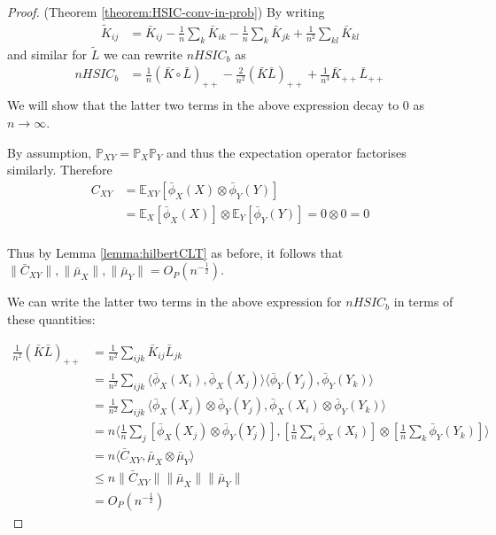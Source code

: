 \documentclass[]{article}
\begin{document}
\begin{proof}(Theorem \ref{theorem:HSIC-conv-in-prob})
By writing
\begin{align*}
\tilde{K}_{ij} &= \bar{K}_{ij} - \frac{1}{n}\sum_k\bar{K}_{ik} - \frac{1}{n}\sum_k\bar{K}_{jk} + \frac{1}{n^2}\sum_{kl}\bar{K}_{kl}
\end{align*} 
and similar for $\tilde{L}$ we can rewrite $nHSIC_b$ as 
\begin{align*}
nHSIC_b & = \frac{1}{n} (\bar{K}\circ \bar{L})_{++}  - \frac{2}{n^2}(\bar{K}\bar{L})_{++} + \frac{1}{n^3}\bar{K}_{++}\bar{L}_{++} \\
\end{align*}
We will show that the latter two terms in the above expression decay to 0 as $n\longrightarrow\infty$. 

By assumption, $\mathbb{P}_{XY} = \mathbb{P}_X\mathbb{P}_Y$ and thus the expectation operator factorises similarly. Therefore 
\begin{align*}
C_{XY} & = \mathbb{E}_{XY}[\bar{\phi}_X(X)\otimes\bar{\phi}_Y(Y)] \\
& = \mathbb{E}_{X}[\bar{\phi}_X(X)]\otimes\mathbb{E}_Y[\bar{\phi}_Y(Y)] = 0\otimes 0 = 0\\
\end{align*}

Thus by Lemma \ref{lemma:hilbertCLT} as before, it follows that $\|\bar{C}_{XY}\|, \|\bar{\mu}_X\|, \|\bar{\mu}_Y\| = O_P(n^{-\frac{1}{2}})$. 

We can write the latter two terms in the above expression for $nHSIC_b$ in terms of these quantities:

\begin{align*}
\frac{1}{n^2}(\bar{K}\bar{L})_{++} &= \frac{1}{n^2} \sum_{ijk}\bar{K}_{ij}\bar{L}_{jk}\\
&= \frac{1}{n^2} \sum_{ijk}\langle \bar{\phi}_X(X_i),\bar{\phi}_X(X_j) \rangle \langle \bar{\phi}_Y(Y_j),\bar{\phi}_Y(Y_k)\rangle \\&=
\frac{1}{n^2} \sum_{ijk}\langle \bar{\phi}_X(X_j)\otimes\bar{\phi}_Y(Y_j),
\bar{\phi}_X(X_i)\otimes\bar{\phi}_Y(Y_k)\rangle \\&=
n\langle \frac{1}{n} \sum_{j}[\bar{\phi}_X(X_j)\otimes\bar{\phi}_Y(Y_j)],
[\frac{1}{n} \sum_{i}\bar{\phi}_X(X_i)]\otimes[\frac{1}{n} \sum_{k}\bar{\phi}_Y(Y_k)]\rangle \\&=
n\langle \bar{C}_{XY},\bar{\mu}_X  \otimes \bar{\mu}_Y \rangle \\ 
&\leq n \|\bar{C}_{XY}\|\|\bar{\mu}_X\| \| \bar{\mu}_Y\|\\
&= O_P(n^{-\frac{1}{2}})
\end{align*}


\end{proof}
\end{document}
